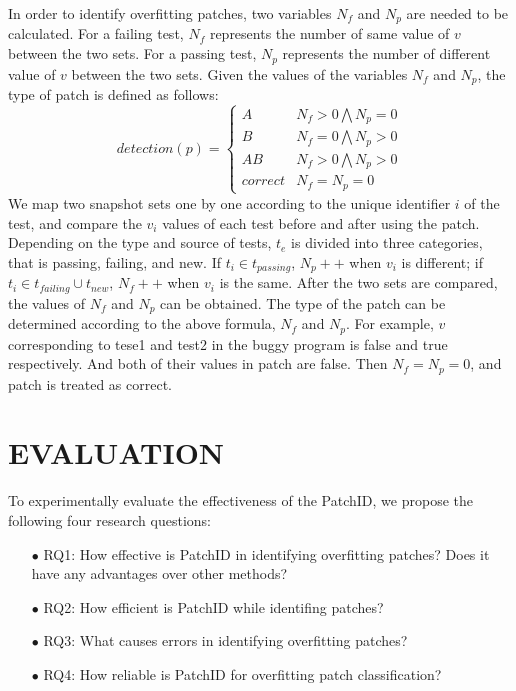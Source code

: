 In order to identify overfitting patches, two variables $N_f$ and $N_p$ are needed to be calculated. For a failing test, $N_f$ represents the number of same value of $v$ between the two sets. For a passing test, $N_p$ represents the number of different value of $v$ between the two sets. Given the values of the variables $N_f$ and $N_p$, the type of patch is defined as follows:
\begin{equation}
	detection(p)= \begin{cases} A& N_f>0\bigwedge N_p = 0\\ B& N_f=0\bigwedge N_p>0\\
		AB& N_f>0\bigwedge N_p>0\\ correct& N_f = N_p = 0\end{cases}
\end{equation}
We map two snapshot sets one by one according to the unique identifier $i$ of the test, and compare the $v_i$ values of each test before and after using the patch. Depending on the type and source of tests, $t_e$ is divided into three categories, that is passing, failing, and new. If $t_i \in t_{passing}$, $N_p++$ when $v_i$ is different; if $t_i \in t_{failing} \cup t_{new}$, $N_f++$ when $v_i$ is the same. After the two sets are compared, the values of $N_f$ and $N_p$ can be obtained. The type of the patch can be determined according to the above formula, $N_f$ and $N_p$.
For example, $v$ corresponding to tese1 and test2 in the buggy program is false and true respectively. And both of their values in patch are false. Then $N_f = N_p = 0$, and patch is treated as correct.

\section{EVALUATION}\label{5}
 To experimentally evaluate the effectiveness of the PatchID, we propose the following four research questions:
\begin{itemize}
	\item[$\bullet$] RQ1: How effective is PatchID in identifying overfitting patches? Does it have any advantages over other methods?
	\item[$\bullet$] RQ2: How efficient is PatchID while identifing patches?
	\item[$\bullet$] RQ3: What causes errors in identifying overfitting patches?
	\item[$\bullet$] RQ4: How reliable is PatchID for overfitting patch classification?
\end{itemize}
